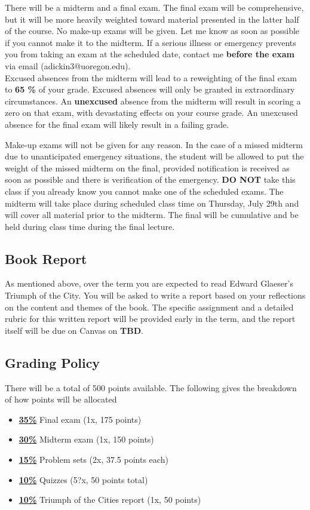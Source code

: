 \documentclass[11pt]{article}
\begin{document}
	There will be a midterm and a final exam. The final exam will be comprehensive, but it will be more heavily weighted toward material presented in the latter half of the course. No make-up exams will be given. Let me know as soon as possible if you cannot make it to the midterm. If a serious illness or emergency prevents you from taking an exam at the scheduled date, contact me \textbf{before the exam} via email (adickin3@uoregon.edu).\\
	
	\noindent Excused absences from the midterm will lead to a reweighting of the final exam to \textbf{65 \%} of your grade.  Excused absences will only be granted in extraordinary circumstances. An \textbf{unexcused} absence from the midterm will result in scoring a zero on that exam, with devastating effects on your course grade. An unexcused absence for the final exam will likely result in a failing grade.
	
	\noindent Make-up exams will not be given for any reason. In the case of a missed midterm due to unanticipated emergency situations, the student will be allowed to put the weight of the missed midterm on the final, provided notification is received as soon as possible and there is verification of the emergency. \textbf{DO NOT} take this class if you already know you cannot make one of the scheduled exams. The midterm will take place during scheduled class time on Thursday, July 29th and will cover all material prior to the midterm. The final will be cumulative and be held during class time during the final lecture.\\
	
	
	\subsection*{Book Report}
	
		As mentioned above, over the term you are expected to read Edward Glaeser’s Triumph of the City. You will be asked to write a report based on your reflections on the content and themes of the book. The specific assignment and a detailed rubric for this written report will be provided early in the term, and the report itself will be due on Canvas on \textbf{TBD}.

	\subsection*{Grading Policy}
	There will be a total of 500 points available. The following gives the breakdown of how points will be allocated 
	\begin{itemize}
		\item \underline{\textbf{35\%}}  Final exam (1x, 175 points)
		\item \underline{\textbf{30\%}}  Midterm exam (1x, 150 points)
		\item \underline{\textbf{15\%}}  Problem sets (2x, 37.5 points each)
		\item \underline{\textbf{10\%}}  Quizzes  (5?x, 50 points total)
		\item \underline{\textbf{10\%}}  Triumph of the Cities report (1x, 50 points)
		
	\end{itemize}
\end{document}
